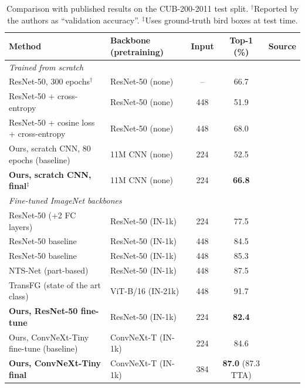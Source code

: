 \documentclass[11pt,a4paper]{article}
\begin{document}
\begin{table}[H]\centering\small
\begin{tabular}{llccc}
\toprule
Method & Backbone (pretraining) & Input & Top-1 (\%) & Source\\
\midrule
\multicolumn{5}{l}{\emph{Trained from scratch}}\\
ResNet-50, 300 epochs$^\dagger$ & ResNet-50 (none) & -- & 66.7 & \cite{featmining}\\
ResNet-50 + cross-entropy & ResNet-50 (none) & 448 & 51.9 & \cite{cosine}\\
ResNet-50 + cosine loss + cross-entropy & ResNet-50 (none) & 448 & 68.0 & \cite{cosine}\\
Ours, scratch CNN, 80 epochs (baseline) & 11M CNN (none) & 224 & 52.5 & \\
\textbf{Ours, scratch CNN, final}$^\ddagger$ & 11M CNN (none) & 224 & \textbf{66.8} & \\
\midrule
\multicolumn{5}{l}{\emph{Fine-tuned ImageNet backbones}}\\
ResNet-50 (+2 FC layers) & ResNet-50 (IN-1k) & 224 & 77.5 & \cite{posthoc}\\
ResNet-50 baseline & ResNet-50 (IN-1k) & 448 & 84.5 & \cite{nts}\\
ResNet-50 baseline & ResNet-50 (IN-1k) & 448 & 85.3 & \cite{cutthumb}\\
NTS-Net (part-based) & ResNet-50 (IN-1k) & 448 & 87.5 & \cite{nts}\\
TransFG (state of the art class) & ViT-B/16 (IN-21k) & 448 & 91.7 & \cite{transfg}\\
\textbf{Ours, ResNet-50 fine-tune} & ResNet-50 (IN-1k) & 224 & \textbf{82.4} & \\
Ours, ConvNeXt-Tiny fine-tune (baseline) & ConvNeXt-T (IN-1k) & 224 & 84.6 & \\
\textbf{Ours, ConvNeXt-Tiny final} & ConvNeXt-T (IN-1k) & 384 & \textbf{87.0} (87.3 TTA) & \\
\bottomrule
\end{tabular}
\caption{Comparison with published results on the CUB-200-2011 test split. $^\dagger$Reported by the authors as ``validation accuracy''. $^\ddagger$Uses ground-truth bird boxes at test time.}
\end{table}
\end{document}
